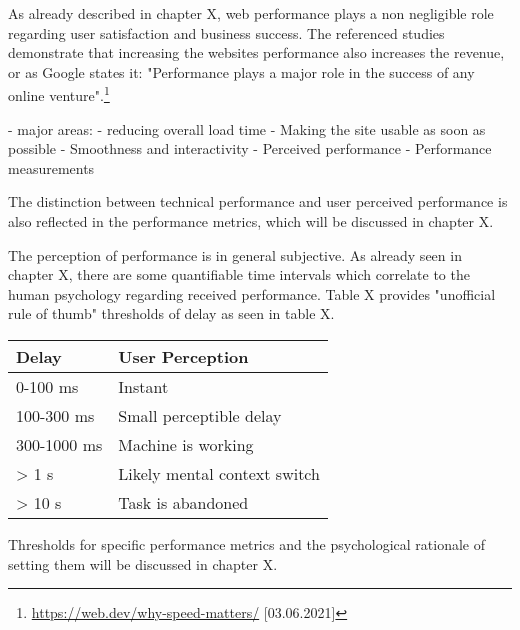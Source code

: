 
As already described in chapter X, web performance plays a non negligible role regarding user satisfaction and business success.
The referenced studies demonstrate that increasing the websites performance also increases the revenue, or as Google states it: "Performance plays a major role in the success of any online venture".\footnote{\url{https://web.dev/why-speed-matters/} [03.06.2021]}






- major areas:
- reducing overall load time
- Making the site usable as soon as possible
- Smoothness and interactivity
- Perceived performance
- Performance measurements



The distinction between technical performance and user perceived performance is also reflected in the performance metrics, which will be discussed in chapter X.



The perception of performance is in general subjective.
As already seen in chapter X, there are some quantifiable time intervals which correlate to the human psychology regarding received performance.
Table X provides "unofficial rule of thumb" thresholds of delay as seen in table X. %

\begin{table}[h]
	\centering
	\begin{tabular}{| l | l | }
	\hline
	Delay & User Perception \\
	\hline
	0-100 ms & Instant \\
	100-300 ms & Small perceptible delay \\
	300-1000 ms & Machine is working \\
	> 1 s & Likely mental context switch \\
	> 10 s & Task is abandoned \\
	\hline
	\end{tabular}
\end{table}

Thresholds for specific performance metrics and the psychological rationale of setting them will be discussed in chapter X.



